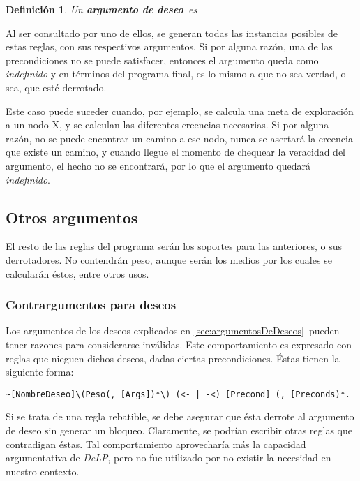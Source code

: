 \documentclass[oneside]{book}
\newtheorem{definicion}{Definición}
\begin{document}
\begin{definicion}
	Un \textbf{argumento de deseo}\ es %
\end{definicion}

Al ser consultado por uno de ellos, se generan todas las instancias posibles de estas
reglas, con sus respectivos argumentos. Si por alguna razón, una de las precondiciones no
se puede satisfacer, entonces el argumento queda como \textit{indefinido} %
y en términos del programa final, es lo mismo a que no sea verdad, o sea, que esté 
derrotado. 

Este caso puede suceder cuando, por ejemplo, se calcula una meta de 
exploración a un nodo X, y se calculan las diferentes creencias necesarias. Si por 
alguna razón, no se puede encontrar un camino a ese nodo, nunca se asertará la creencia
que existe un camino, y cuando llegue el momento de chequear la veracidad del argumento,
el hecho no se encontrará, por lo que el argumento quedará \textit{indefinido}. 

\subsection{Otros argumentos}

El resto de las reglas del programa serán los soportes para las anteriores, 
o sus derrotadores. No 
contendrán peso, aunque serán los medios por los cuales se calcularán éstos, entre
otros usos.

\subsubsection{Contrargumentos para deseos}

Los argumentos de los deseos explicados en \ref{sec:argumentosDeDeseos}\ pueden tener
razones para considerarse inválidas. Este comportamiento es expresado con reglas que 
nieguen dichos deseos, dadas ciertas precondiciones. Éstas tienen la siguiente forma:

\begin{verbatim}
~[NombreDeseo]\(Peso(, [Args])*\) (<- | -<) [Precond] (, [Preconds)*.
\end{verbatim}

Si se trata de una regla rebatible, se debe asegurar que ésta derrote al argumento
de deseo sin generar un bloqueo. Claramente, se podrían escribir otras reglas que
contradigan éstas. Tal comportamiento aprovecharía más la capacidad argumentativa 
de \textit{DeLP}, pero no fue utilizado por no existir la necesidad
en nuestro contexto.
\end{document}
